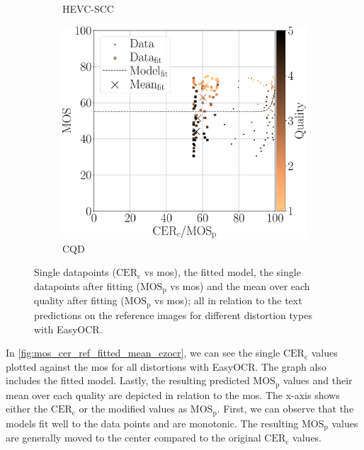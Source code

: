 \begin{figure}
\begin{subfigure}[b]{0.32\textwidth}
        \caption{HEVC-SCC}
        \label{fig:mos_cer_ref_fitted_mean_ezocr_HEVC-SCC}
    \end{subfigure}%
    \hfill
    \begin{subfigure}[b]{0.32\textwidth}
        \includegraphics[width=\textwidth]{../../images/analyze/mos_cer_ref_fitted_mean_ezocr_CQD.pdf}
        \caption{CQD}
        \label{fig:mos_cer_ref_fitted_mean_ezocr_CQD}
    \end{subfigure}%
    \caption{Single datapoints ($\text{CER}_{\text{c}}$ vs \gls{mos}), the fitted model, the single datapoints after fitting ($\text{MOS}_{\text{p}}$ vs \gls{mos}) and the mean over each quality after fitting ($\text{MOS}_{\text{p}}$ vs \gls{mos}); all in relation to the text predictions on the reference images for different distortion types with EasyOCR.}
\label{fig:mos_cer_ref_fitted_mean_ezocr}
\end{figure}
In \autoref{fig:mos_cer_ref_fitted_mean_ezocr}, we can see the single $\text{CER}_{\text{c}}$ values plotted against the \gls{mos} for all distortions with EasyOCR.
The graph also includes the fitted model.
Lastly, the resulting predicted $\text{MOS}_{\text{p}}$ values and their mean over each quality are depicted in relation to the \gls{mos}.
The x-axis shows either the $\text{CER}_{\text{c}}$ or the modified values as $\text{MOS}_{\text{p}}$.
First, we can observe that the models fit well to the data points and are monotonic.
The resulting $\text{MOS}_{\text{p}}$ values are generally moved to the center compared to the original $\text{CER}_{\text{c}}$ values.
